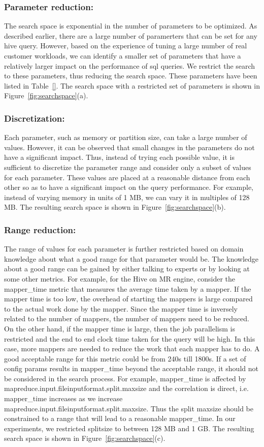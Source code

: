 \noindent\subsubsection*{\bf Parameter reduction: }
\label{sec:paramreduction}
The search space is exponential in the number of parameters to be optimized. As described earlier, there are a large number of paramerters that can be set for any hive query. However, based on the experience of tuning a large number of real customer workloads, we can identify a smaller set of parameters that have a relatively larger impact on the performance of sql queries. We restrict the search to these parameters, thus reducing the search space. These parameters have been listed in Table~\ref{}. The search space with a restricted set of parameters is shown in Figure~\ref{fig:searchspace}(a).
\noindent\subsubsection*{\bf Discretization: }
Each parameter, such as memory or partition size, can take a large number of values. However, it can be observed that small changes in the parameters do not have a significant impact. Thus, instead of trying each possible value, it is sufficient to discretize the parameter range and consider only a subset of values for each parameter. These values are placed at a reasonable distance from each other so as to have a significant impact on the query performance. For example, instead of varying memory in units of 1 MB, we can vary it in multiples of 128 MB. The resulting search space is shown in Figure~\ref{fig:searchspace}(b).
\noindent\subsubsection*{\bf Range reduction: }
The range of values for each parameter is further restricted based on domain knowledge about what a good range for that parameter would be.  The knowledge about a good range can be gained by either talking to experts or by looking at some other metrics. For example, for the Hive on MR engine, consider the mapper\_time metric that measures the average time taken by a mapper. If the mapper time is too low, the overhead of starting the mappers is large compared to the actual work done by the mapper. Since the mapper time is inversely related to the number of mappers, the number of mappers need to be reduced. On the other hand, if the mapper time is large, then the job parallelism is restricted and the end to end clock time taken for the query will be high. In this case, more mappers are needed to reduce the work that each mapper has to do. A good acceptable range for this metric could be from 240s till 1800s.  If a set of config params results in mapper\_time beyond the acceptable range, it should not be considered in the search process. For example, mapper\_time is affected by mapreduce.input.fileinputformat.split.maxsize and the correlation is direct, i.e. mapper\_time  increases as we increase mapreduce.input.fileinputformat.split.maxsize.  Thus the split maxsize should be constrained to a range that will lead to a reasonable mapper\_time. In our experiments, we restricted splitsize to between 128 MB and 1 GB. The resulting search space is shown in Figure~\ref{fig:searchspace}(c).
